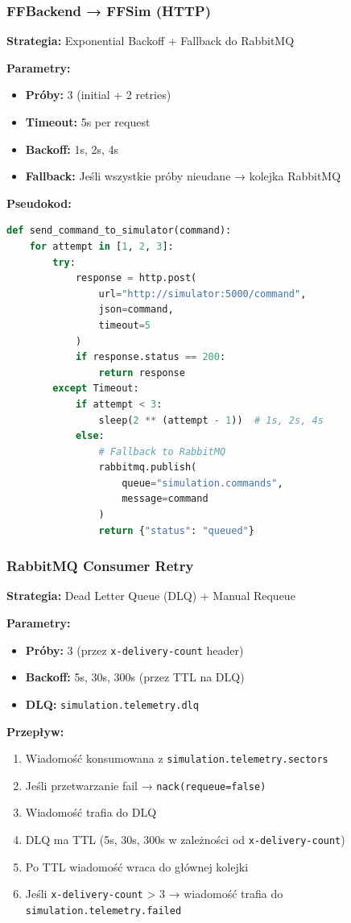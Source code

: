 \documentclass[11pt,a4paper] {article}
\begin{document}
\subsubsection{FFBackend → FFSim (HTTP)}

\textbf{Strategia:} Exponential Backoff + Fallback do RabbitMQ

\textbf{Parametry:}
\begin{itemize}
    \item \textbf{Próby:} 3 (initial + 2 retries)
    \item \textbf{Timeout:} 5s per request
    \item \textbf{Backoff:} 1s, 2s, 4s
    \item \textbf{Fallback:} Jeśli wszystkie próby nieudane → kolejka RabbitMQ
\end{itemize}

\textbf{Pseudokod:}
\begin{lstlisting}[language=Python]
def send_command_to_simulator(command):
    for attempt in [1, 2, 3]:
        try:
            response = http.post(
                url="http://simulator:5000/command",
                json=command,
                timeout=5
            )
            if response.status == 200:
                return response
        except Timeout:
            if attempt < 3:
                sleep(2 ** (attempt - 1))  # 1s, 2s, 4s
            else:
                # Fallback to RabbitMQ
                rabbitmq.publish(
                    queue="simulation.commands",
                    message=command
                )
                return {"status": "queued"}
\end{lstlisting}

\subsubsection{RabbitMQ Consumer Retry}

\textbf{Strategia:} Dead Letter Queue (DLQ) + Manual Requeue

\textbf{Parametry:}
\begin{itemize}
    \item \textbf{Próby:} 3 (przez \texttt{x-delivery-count} header)
    \item \textbf{Backoff:} 5s, 30s, 300s (przez TTL na DLQ)
    \item \textbf{DLQ:} \texttt{simulation.telemetry.dlq}
\end{itemize}

\textbf{Przepływ:}
\begin{enumerate}
    \item Wiadomość konsumowana z \texttt{simulation.telemetry.sectors}
    \item Jeśli przetwarzanie fail → \texttt{nack(requeue=false)}
    \item Wiadomość trafia do DLQ
    \item DLQ ma TTL (5s, 30s, 300s w zależności od \texttt{x-delivery-count})
    \item Po TTL wiadomość wraca do głównej kolejki
    \item Jeśli \texttt{x-delivery-count} > 3 → wiadomość trafia do \texttt{simulation.telemetry.failed}
\end{enumerate}
\end{document}
